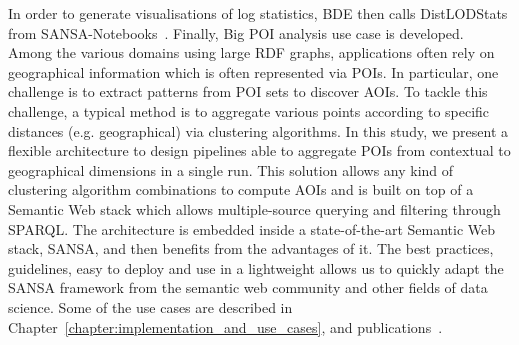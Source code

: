 \begin{enumerate}
    In order to generate visualisations of log statistics, BDE then calls DistLODStats from SANSA-Notebooks~\cite{iermilov-2017-sansa-iswc-demo}.
    Finally, Big \gls{POI} analysis use case is developed.
    Among the various domains using large \gls{RDF} graphs, applications often rely on geographical information which is often represented via \gls{POI}s.
    In particular, one challenge is to extract patterns from \gls{POI} sets to discover \gls{AOI}s.
    To tackle this challenge, a typical method is to aggregate various points according to specific distances (e.g. geographical) via clustering algorithms. 
    In this study, we present a flexible architecture to design pipelines able to aggregate \gls{POI}s from contextual to geographical dimensions in a single run. 
    This solution allows any kind of clustering algorithm combinations to compute \gls{AOI}s and is built on top of a Semantic Web stack which allows multiple-source querying and filtering through \gls{SPARQL}.
    The architecture is embedded inside a state-of-the-art Semantic Web stack, SANSA, and then benefits from the advantages of it.
    The best practices, guidelines, easy to deploy and use in a lightweight allows us to quickly adapt the SANSA framework from the semantic web community and other fields of data science.
    Some of the use cases are described in Chapter~\ref{chapter:implementation_and_use_cases}, and publications~\cite{lehmann-2017-sansa-iswc, iermilov-2017-sansa-iswc-demo, sansa-hubs-and-authorities-transaction-semantics19-poster, piping-clustering-eswc19-poster, graux-2018-sansa-ethereum-semantics-poster, Auer+ICWE-2017}.

\end{enumerate}


